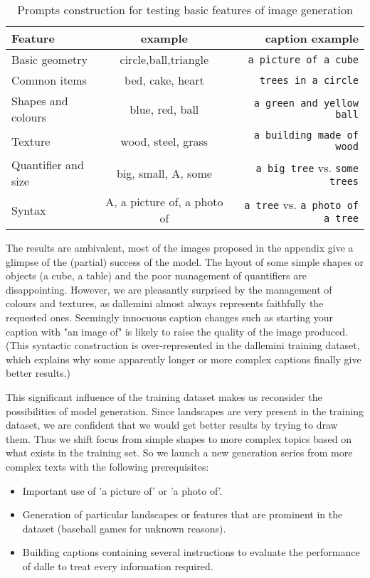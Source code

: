 \documentclass{article}
\begin{document}
\begin{multicols}{2}
\begin{table*}[]
    \centering
    \begin{tabular}{|l|c|r|}
        \hline
        Feature & example & caption example \tabularnewline
        \hline
        Basic geometry & circle,ball,triangle & \texttt{a picture of a cube} \tabularnewline \hline
        Common items & bed, cake, heart & \texttt{trees in a circle} \tabularnewline \hline
        Shapes and colours & blue, red, ball & \texttt{a green and yellow ball} \tabularnewline \hline
        Texture & wood, steel, grass & \texttt{a building made of wood}\tabularnewline \hline 
        Quantifier and size & big, small, A, some & \texttt{a big tree} vs. \texttt{some trees} \tabularnewline \hline
        Syntax & A, a picture of, a photo of & \texttt{a tree} vs. \texttt{a photo of a tree} \tabularnewline
        \hline
    \end{tabular}
    \caption{Prompts construction for testing basic features of image generation}
    \label{tab:prompts}
\end{table*}

The results are ambivalent, most of the images proposed in the appendix give a glimpse of the (partial) success of the model. The layout of some simple shapes or objects (a cube, a table) and the poor management of quantifiers are disappointing.
However, we are pleasantly surprised by the management of colours and textures, as \gls{dallemini} almost always represents faithfully the requested ones.
Seemingly innocuous caption changes such as starting your caption with "an image of" is likely to raise the quality of the image produced.
(This syntactic construction is over-represented in the \gls{dallemini} training dataset, which explains why some apparently longer or more complex captions finally give better results.)

This significant influence of the training dataset makes us reconsider the possibilities of model generation. Since landscapes are very present in the training dataset, we are confident that we would get better results by trying to draw them.
Thus we shift focus from simple shapes to more complex topics based on what exists in the training set.
So we launch a new generation series from more complex texts with the following prerequisites:
\begin{itemize}
    \item Important use of 'a picture of' or 'a photo of'.
    \item Generation of particular landscapes or features that are prominent in the dataset (baseball games for unknown reasons).
    \item Building captions containing several instructions to evaluate the performance of \gls{dalle} to treat every information required.
\end{itemize}


\end{multicols}
\end{document}
